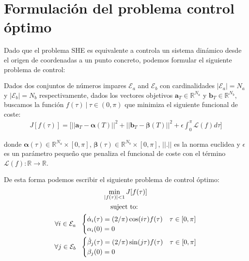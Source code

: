 
\section{Formulación del problema control óptimo}

Dado que el problema SHE es equivalente a controla un sistema dinámico desde el origen de coordenadas a un punto concreto, podemos formular el siguiente problema de control:
\begin{problem}\label{OCP1}
    Dados dos conjuntos de números impares $\mathcal{E}_a$ and $\mathcal{E}_b$ con cardinalidades $|\mathcal{E}_a| = N_a$ y  $|\mathcal{E}_b| = N_b$ respectivamente, dados los vectores objetivos $\bm{a}_T  \in \mathbb{R}^{N_a}$ y $\bm{b}_T  \in \mathbb{R}^{N_b}$, buscamos la función  $f(\tau ) \ | \ \tau \in (0,\pi)$ que minimiza el siguiente funcional de coste:
        \begin{gather}
        J[f(\tau)] = \Bigg[ || \bm{a}_T - \bm{\alpha}(T)||^2 + || \bm{b}_T - \bm{\beta}(T)||^2 
        + \epsilon \int_0^{\pi} \mathcal{L}(f) d\tau \Bigg] 
    \end{gather}

    donde  $\bm{\alpha}(\tau) \in \mathbb{R}^{N_a} \times [0,\pi]$, $\bm{\beta}(\tau) \in \mathbb{R}^{N_b}  \times [0,\pi]$,  $||.||$ es la norma euclidea y $\epsilon$ es un parámetro pequeño que penaliza el funcional de coste con el término $\mathcal{L}(f):\mathbb{R} \rightarrow \mathbb{R}$. 
    \newline

    De esta forma podemos escribir el siguiente problema de control óptimo:
    \begin{gather}
        \min_{|f(\tau) |<1} J[f(\tau)] \\
        \notag \text{suject to: } \\
        \notag \forall i \in \mathcal{E}_a\ \ 
        \begin{cases}
            \dot{\alpha}_i(\tau) = (2/\pi) \cos(i\tau) f(\tau) & \tau \in [0,\pi]\label{dyn}\\
            \alpha_i(0) = 0
        \end{cases} \\
        \notag \forall j \in \mathcal{E}_b\ \ 
        \begin{cases}
            \dot{\beta}_j(\tau) = (2/\pi) \sin(j\tau) f(\tau) & \tau \in [0,\pi]\label{dyn}\\
            \beta_j(0) = 0
        \end{cases} 
    \end{gather}
\end{problem}

